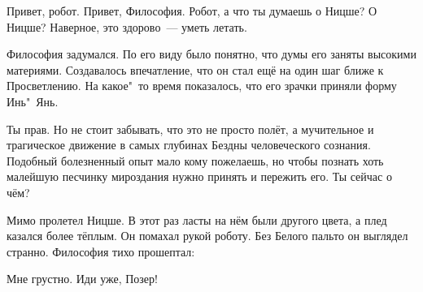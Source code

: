{\small
\begin{dialog}
\X Привет, робот.
\R Привет, Философия.
\X Робот, а что ты думаешь о Ницше?
\R О Ницше? Наверное, это здорово~--- уметь летать.
\end{dialog}

\begin{monolog}
Философия задумался. По его виду было понятно, что думы его заняты высокими материями. Создавалось впечатление, что он стал ещё на один шаг ближе к Просветлению. На какое"~то время показалось, что его зрачки приняли форму Инь"~Янь.
\end{monolog}

\begin{dialog}
\X Ты прав. Но не стоит забывать, что это не просто полёт, а мучительное и трагическое движение в самых глубинах Бездны человеческого сознания. Подобный болезненный опыт мало кому пожелаешь, но чтобы познать хоть малейшую песчинку мироздания нужно принять и пережить его.
\R Ты сейчас о чём?
\end{dialog}

\begin{monolog}
Мимо пролетел Ницше. В этот раз ласты на нём были другого цвета, а плед казался более тёплым. Он помахал рукой роботу. Без Белого пальто он выглядел странно. Философия тихо прошептал:
\end{monolog}

\begin{dialog}
\X Мне грустно.
\R Иди уже, Позер!
\end{dialog}
}